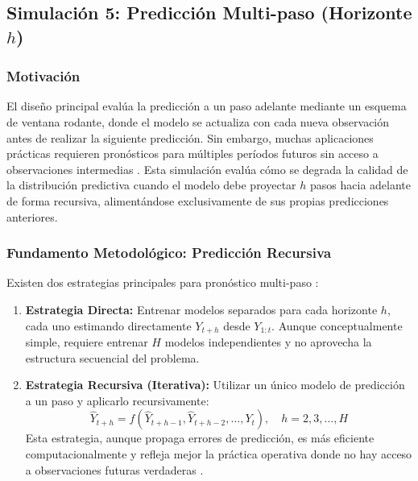 

\subsection{\texorpdfstring{Simulación 5: Predicción Multi-paso (Horizonte $h$)}{Simulación 5: Predicción Multi-paso (Horizonte h)}}
\label{subsec:sim5_multi_paso}

\subsubsection{Motivación}

El diseño principal evalúa la predicción a un paso adelante mediante un esquema de ventana rodante, donde el modelo se actualiza con cada nueva observación antes de realizar la siguiente predicción. Sin embargo, muchas aplicaciones prácticas requieren pronósticos para múltiples períodos futuros sin acceso a observaciones intermedias \parencite{Hyndman2021FPP3}. Esta simulación evalúa cómo se degrada la calidad de la distribución predictiva cuando el modelo debe proyectar $h$ pasos hacia adelante de forma recursiva, alimentándose exclusivamente de sus propias predicciones anteriores.

\subsubsection{Fundamento Metodológico: Predicción Recursiva}

Existen dos estrategias principales para pronóstico multi-paso \parencite{Taieb2012}:

\begin{enumerate}
\item \textbf{Estrategia Directa:} Entrenar modelos separados para cada horizonte $h$, cada uno estimando directamente $Y_{t+h}$ desde $Y_{1:t}$. Aunque conceptualmente simple, requiere entrenar $H$ modelos independientes y no aprovecha la estructura secuencial del problema.

\item \textbf{Estrategia Recursiva (Iterativa):} Utilizar un único modelo de predicción a un paso y aplicarlo recursivamente:
\begin{equation}
\hat{Y}_{t+h} = f(\hat{Y}_{t+h-1}, \hat{Y}_{t+h-2}, \ldots, Y_t), \quad h = 2, 3, \ldots, H
\end{equation}
Esta estrategia, aunque propaga errores de predicción, es más eficiente computacionalmente y refleja mejor la práctica operativa donde no hay acceso a observaciones futuras verdaderas \parencite{Bontempi2013}.
\end{enumerate}

